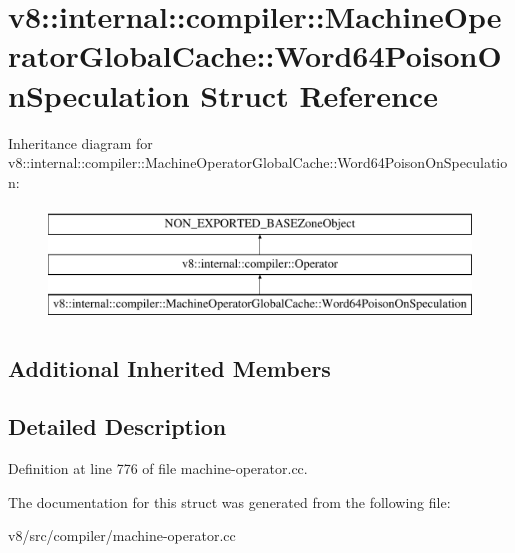 \hypertarget{structv8_1_1internal_1_1compiler_1_1MachineOperatorGlobalCache_1_1Word64PoisonOnSpeculation}{}\section{v8\+:\+:internal\+:\+:compiler\+:\+:Machine\+Operator\+Global\+Cache\+:\+:Word64\+Poison\+On\+Speculation Struct Reference}
\label{structv8_1_1internal_1_1compiler_1_1MachineOperatorGlobalCache_1_1Word64PoisonOnSpeculation}
Inheritance diagram for v8\+:\+:internal\+:\+:compiler\+:\+:Machine\+Operator\+Global\+Cache\+:\+:Word64\+Poison\+On\+Speculation\+:\begin{figure}[H]
\begin{center}
\leavevmode
\includegraphics[height=3.000000cm]{structv8_1_1internal_1_1compiler_1_1MachineOperatorGlobalCache_1_1Word64PoisonOnSpeculation}
\end{center}
\end{figure}
\subsection*{Additional Inherited Members}


\subsection{Detailed Description}


Definition at line 776 of file machine-\/operator.\+cc.



The documentation for this struct was generated from the following file\+:\begin{DoxyCompactItemize}
\item 
v8/src/compiler/machine-\/operator.\+cc\end{DoxyCompactItemize}
